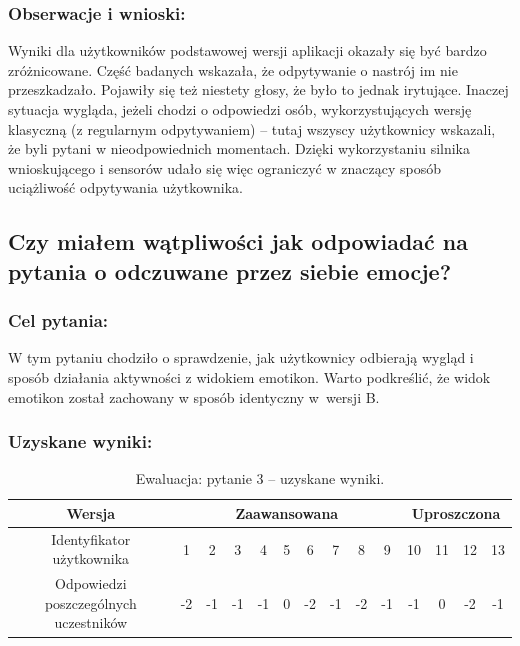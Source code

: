 	\subsubsection{Obserwacje i wnioski:}
	
	Wyniki dla użytkowników podstawowej wersji aplikacji okazały się być bardzo zróżnicowane. Część badanych wskazała, że odpytywanie o nastrój im nie przeszkadzało. Pojawiły się też niestety głosy, że było to jednak irytujące. Inaczej sytuacja wygląda, jeżeli chodzi o odpowiedzi osób, wykorzystujących wersję klasyczną (z regularnym odpytywaniem) -- tutaj wszyscy użytkownicy wskazali, że byli pytani w nieodpowiednich momentach. Dzięki wykorzystaniu silnika wnioskującego i sensorów udało się więc ograniczyć w znaczący sposób uciążliwość odpytywania użytkownika.
	
	
	\subsection{Czy miałem wątpliwości jak odpowiadać na pytania o odczuwane przez siebie emocje?}
	
	\subsubsection{Cel pytania:}
	
	W tym pytaniu chodziło o sprawdzenie, jak użytkownicy odbierają wygląd i sposób działania aktywności z widokiem emotikon. Warto podkreślić, że widok emotikon został zachowany w sposób identyczny w~wersji B.
	
	\subsubsection{Uzyskane wyniki:}
	
	\begin{table}[!h]
		\caption{Ewaluacja: pytanie 3 -- uzyskane wyniki.}
		\centering
		\begin{tabular}{|c|c|c|c|c|c|c|c|c|c|c|c|c|c|}
			\hline
			Wersja &  \multicolumn{9}{c|}{Zaawansowana} & \multicolumn{4}{c|}{Uproszczona}\\ \hline
			Identyfikator użytkownika             & 1 & 2 & 3 & 4 & 5 & 6 & 7 & 8 & 9 
			& 10 & 11 & 12 & 13 \\ \hline
			Odpowiedzi poszczególnych uczestników & -2 & -1 & -1 & -1 & 0 & -2 & -1 & -2 & -1
			& -1 & 0 & -2 & -1  \\ \hline
		\end{tabular}
	\end{table}
	
